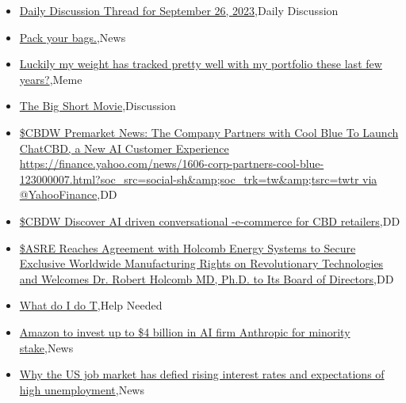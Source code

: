 \documentclass{article}%
\begin{document}
%
\begin{itemize}%
\item%
\href{https://reddit.com/r/wallstreetbets/comments/16sjij7/daily\_discussion\_thread\_for\_september\_26\_2023/}{Daily Discussion Thread for September 26, 2023},Daily Discussion%
\item%
\href{https://reddit.com/r/wallstreetbets/comments/16sjfym/pack\_your\_bags/}{Pack your bags.},News%
\item%
\href{https://reddit.com/r/wallstreetbets/comments/16sdl59/luckily\_my\_weight\_has\_tracked\_pretty\_well\_with\_my/}{Luckily my weight has tracked pretty well with my portfolio these last few years?},Meme%
\item%
\href{https://reddit.com/r/wallstreetbets/comments/16sdi2w/the\_big\_short\_movie/}{The Big Short Movie},Discussion%
\item%
\href{https://reddit.com/r/Baystreetbets/comments/16smric/cbdw\_premarket\_news\_the\_company\_partners\_with/}{\$CBDW Premarket News: The Company Partners with Cool Blue To Launch ChatCBD, a New AI Customer Experience https://finance.yahoo.com/news/1606-corp-partners-cool-blue-123000007.html?soc\_src=social-sh\&amp;soc\_trk=tw\&amp;tsrc=twtr via @YahooFinance},DD%
\item%
\href{https://reddit.com/r/Baystreetbets/comments/16s2f99/cbdw\_discover\_ai\_driven\_conversational\_ecommerce/}{\$CBDW Discover AI driven conversational -e-commerce for CBD retailers},DD%
\item%
\href{https://reddit.com/r/Baystreetbets/comments/16rtmjr/asre\_reaches\_agreement\_with\_holcomb\_energy/}{\$ASRE Reaches Agreement with Holcomb Energy Systems to Secure Exclusive Worldwide Manufacturing Rights on Revolutionary Technologies and Welcomes Dr. Robert Holcomb MD, Ph.D. to Its Board of Directors},DD%
\item%
\href{https://reddit.com/r/StockMarket/comments/16rpxjp/what\_do\_i\_do\_t/}{What do I do T},Help Needed%
\item%
\href{https://reddit.com/r/StockMarket/comments/16rogqi/amazon\_to\_invest\_up\_to\_4\_billion\_in\_ai\_firm/}{Amazon to invest up to \$4 billion in AI firm Anthropic for minority stake},News%
\item%
\href{https://reddit.com/r/Economics/comments/16s0cuj/why\_the\_us\_job\_market\_has\_defied\_rising\_interest/}{Why the US job market has defied rising interest rates and expectations of high unemployment},News%
\end{itemize}%
\end{document}

